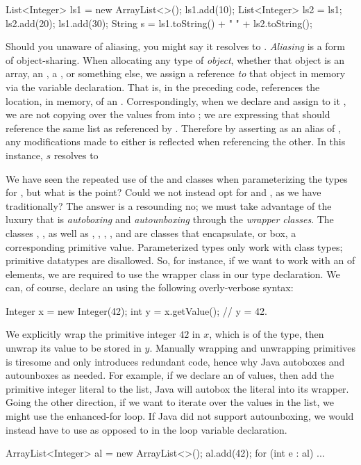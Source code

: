 \begin{verbnobox}[\footnotesize]
List<Integer> ls1 = new ArrayList<>();
ls1.add(10);
List<Integer> ls2 = ls1;
ls2.add(20);
ls1.add(30);
String s = ls1.toString() + " " + ls2.toString();
\end{verbnobox}
Should you unaware of aliasing, you might say it resolves to . \textit{Aliasing} is a form of object-sharing. When allocating any type of \textit{object}, whether that object is an array, an , a , or something else, we assign a reference \textit{to} that object in memory via the variable declaration. That is, in the preceding code,  references the location, in memory, of an . Correspondingly, when we declare  and assign to it , we are not copying over the values from  into ; we are expressing that  should reference the same list as referenced by . Therefore by asserting  as an alias of , any modifications made to either is reflected when referencing the other. In this instance, $s$ resolves to 

We have seen the repeated use of the  and  classes when parameterizing the types for , but what is the point? Could we not instead opt for  and , as we have traditionally? The answer is a resounding no; we must take advantage of the luxury that is \textit{autoboxing} and \textit{autounboxing} through the \textit{wrapper classes}. The classes , , as well as , , , , and  are classes that encapsulate, or box, a corresponding primitive value. Parameterized types only work with class types; primitive datatypes are disallowed. So, for instance, if we want to work with an  of  elements, we are required to use the  wrapper class in our type declaration. We can, of course, declare an  using the following overly-verbose syntax:
\begin{verbnobox}[\footnotesize]
Integer x = new Integer(42);
int y = x.getValue(); // y = 42.
\end{verbnobox}
We explicitly wrap the primitive integer $42$ in $x$, which is of the  type, then unwrap its value to be stored in $y$. Manually wrapping and unwrapping primitives is tiresome and only introduces redundant code, hence why Java autoboxes and autounboxes as needed. For example, if we declare an  of  values, then add the primitive integer literal  to the list, Java will autobox the literal into its  wrapper. Going the other direction, if we want to iterate over the values in the list, we might use the enhanced-for loop. If Java did not support autounboxing, we would instead have to use  as opposed to  in the loop variable declaration. 
\begin{verbnobox}[\footnotesize]
ArrayList<Integer> al = new ArrayList<>();
al.add(42);
for (int e : al) {
  ...
}
\end{verbnobox}

